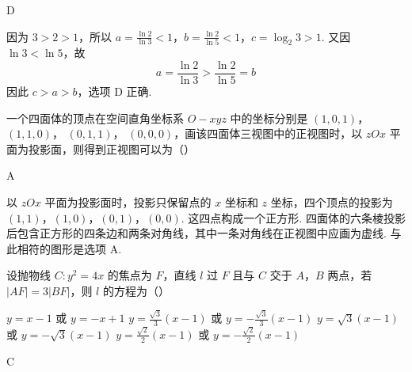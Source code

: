 \begin{answer}
D
\end{answer}

\begin{solution}
因为 \(3>2>1\)，所以 \(a=\frac{\ln2}{\ln3}<1\)，\(b=\frac{\ln2}{\ln5}<1\)，\(c=\log_2 3>1\).
又因 \(\ln3<\ln5\)，故
\[
a=\frac{\ln2}{\ln3}>\frac{\ln2}{\ln5}=b
\]
因此 \(c>a>b\)，选项 D 正确.
\end{solution}

\begin{problem}
一个四面体的顶点在空间直角坐标系 \(O - xyz\) 中的坐标分别是 \( (1,0,1) \)， \( (1,1,0) \)， \( (0,1,1) \)， \( (0,0,0) \)，画该四面体三视图中的正视图时，以 \(zOx\) 平面为投影面，则得到正视图可以为（\quad）

    {}
    {}
    {}
\end{problem}

\begin{answer}
A
\end{answer}

\begin{solution}
以 \(zOx\) 平面为投影面时，投影只保留点的 \(x\) 坐标和 \(z\) 坐标，四个顶点的投影为 \((1,1)\)，\((1,0)\)，\((0,1)\)，\((0,0)\).
这四点构成一个正方形. 四面体的六条棱投影后包含正方形的四条边和两条对角线，其中一条对角线在正视图中应画为虚线. 与此相符的图形是选项 A.
\end{solution}

\begin{problem}
设抛物线 \(C: y^{2} = 4x\) 的焦点为 \(F\)，直线 \(l\) 过 \(F\) 且与 \(C\) 交于 \(A\)，\(B\) 两点，若 \(|AF| = 3|BF|\)，则 \(l\) 的方程为（\quad）

\choices
    {\( y = x - 1 \) 或 \( y = -x + 1 \)}
    {\( y = \frac{\sqrt{3}}{3} (x - 1) \) 或 \( y = -\frac{\sqrt{3}}{3} (x - 1) \)}
    {\( y = \sqrt{3} (x - 1) \) 或 \( y = -\sqrt{3} (x - 1) \)}
    {\( y = \frac{\sqrt{2}}{2} (x - 1) \) 或 \( y = -\frac{\sqrt{2}}{2} (x - 1) \)}
\end{problem}

\begin{answer}
C
\end{answer}


